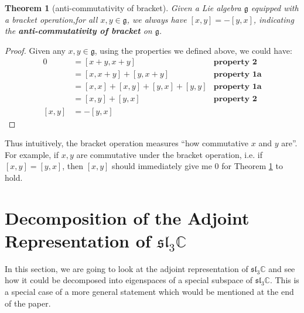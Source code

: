 \documentclass[a4paper]{article}
\newcommand{\C}{\mathbb{C}}
\theoremstyle{bfnote} %
\newtheorem{thm}{Theorem}[section] %
\theoremstyle{bfnote}                  %
\theoremstyle{example}                       %
\theoremstyle{remark}                       %
\numberwithin{equation}{section}
\begin{document}
\bigskip

\begin{thm}[anti-commutativity of bracket]\label{anti-commutativity}
	Given a Lie algebra $\mathfrak{g}$ equipped with a bracket operation,for all  $x,y \in \mathfrak{g}$, we always have $[x,y] = -[y,x]$, indicating the \textbf{anti-commutativity of bracket} on $\mathfrak{g}$. 	
\end{thm}

\begin{proof}
Given any $x,y \in \mathfrak{g}$, using the properties we defined above, we could have:
\begin{align*}
	0 &= [x+y, x+y] & \textbf{property 2} \\
	 &= [x, x+y] + [y, x+y] & \textbf{property 1a} \\
		   &= [x,x] + [x,y] + [y,x] + [y,y] & \textbf{property 1a} \\
		   &= [x,y] + [y,x] & \textbf{property 2} \\
	[x,y] &= -[y,x]
\end{align*}
\end{proof}
Thus intuitively, the bracket operation measures ``how commutative $x$ and  $y$ are''. For example, if $x, y$ are commutative under the bracket operation,  i.e. if  $[x,y] = [y,x]$, then  $[x,y]$ should immediately give me  $0$ for Theorem \ref{anti-commutativity} to hold. 

\section{Decomposition of the Adjoint Representation of $\mathfrak{sl}_3\C$}
In this section, we are going to look at the adjoint representation of $\mathfrak{sl}_3\C$ and see how it could be decomposed into eigenspaces of a special subspace of  $\mathfrak{sl}_3\C$. This is a special case of a more general statement which would be mentioned at the end of the paper.
\end{document}
